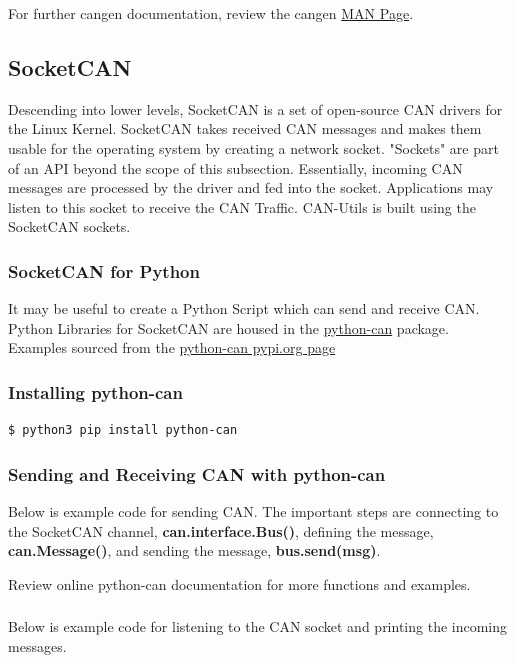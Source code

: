             For further cangen documentation, review the cangen \href{https://manpages.debian.org/stretch-backports/can-utils/cangen.1.en.html}{MAN Page}. 
    \subsection{SocketCAN}
    Descending into lower levels, SocketCAN is a set of open-source CAN drivers for the Linux Kernel. SocketCAN takes received CAN messages and makes them usable for the operating system by creating a network socket. "Sockets" are part of an API beyond the scope of this subsection. Essentially, incoming CAN messages are processed by the driver and fed into the socket. Applications may listen to this socket to receive the CAN Traffic. CAN-Utils is built using the SocketCAN sockets.
        \subsubsection{SocketCAN for Python}
            It may be useful to create a Python Script which can send and receive CAN. Python Libraries for SocketCAN are housed in the \href{https://python-can.readthedocs.io/en/master/interfaces/socketcan.html}{python-can} package. Examples sourced from the \href{https://pypi.org/project/python-can/}{python-can pypi.org page}
        \subsubsection{Installing python-can}
            \begin{lstlisting}[language=bash, autogobble=true]
                $ python3 pip install python-can
            \end{lstlisting}
        \subsubsection{Sending and Receiving CAN with python-can}
            Below is example code for sending CAN. The important steps are connecting to the SocketCAN channel, \textbf{can.interface.Bus()}, defining the message, \textbf{can.Message()}, and sending the message, \textbf{bus.send(msg)}.
            

            Review online python-can documentation for more functions and examples.
            
            \subsubsection{}
            Below is example code for listening to the CAN socket and printing the incoming messages.
            
